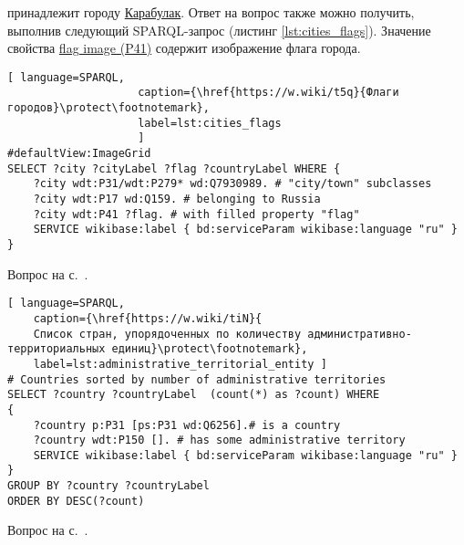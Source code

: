 \begin{task}
    \label{answer:cities_flags}
     принадлежит городу \href{https://w.wiki/oLF}{Карабулак}. Ответ на вопрос также можно получить, выполнив следующий SPARQL-запрос (листинг \ref{lst:cities_flags}). Значение свойства \href{https://www.wikidata.org/wiki/Property:P41}{flag image (P41)} содержит изображение флага города.
    
    \begin{lstlisting}[ language=SPARQL, 
                    caption={\href{https://w.wiki/t5q}{Флаги городов}\protect\footnotemark},
                    label=lst:cities_flags
                    ]
#defaultView:ImageGrid
SELECT ?city ?cityLabel ?flag ?countryLabel WHERE {
	?city wdt:P31/wdt:P279* wd:Q7930989. # "city/town" subclasses
	?city wdt:P17 wd:Q159. # belonging to Russia	
	?city wdt:P41 ?flag. # with filled property "flag"
	SERVICE wikibase:label { bd:serviceParam wikibase:language "ru" }
}
\end{lstlisting}
    
    \small{\AnswerBackref Вопрос на с.~\pageref{lst:countries_sister_cities_with_Russia}.}
\end{task}




\newpage
\hfil{}\hfil%

\begin{task}
	\label{answer:administrative_territorial}
	
\begin{lstlisting}[ language=SPARQL, 
	caption={\href{https://w.wiki/tiN}{
	Список стран, упорядоченных по количеству административно-территориальных единиц}\protect\footnotemark},
	label=lst:administrative_territorial_entity	]
# Countries sorted by number of administrative territories
SELECT ?country ?countryLabel  (count(*) as ?count) WHERE
{
    ?country p:P31 [ps:P31 wd:Q6256].# is a country
    ?country wdt:P150 []. # has some administrative territory
    SERVICE wikibase:label { bd:serviceParam wikibase:language "ru" }
}
GROUP BY ?country ?countryLabel
ORDER BY DESC(?count)
\end{lstlisting}
	
\small{\AnswerBackref Вопрос на с.~\pageref{lst:age_of_country}.}
\end{task}



